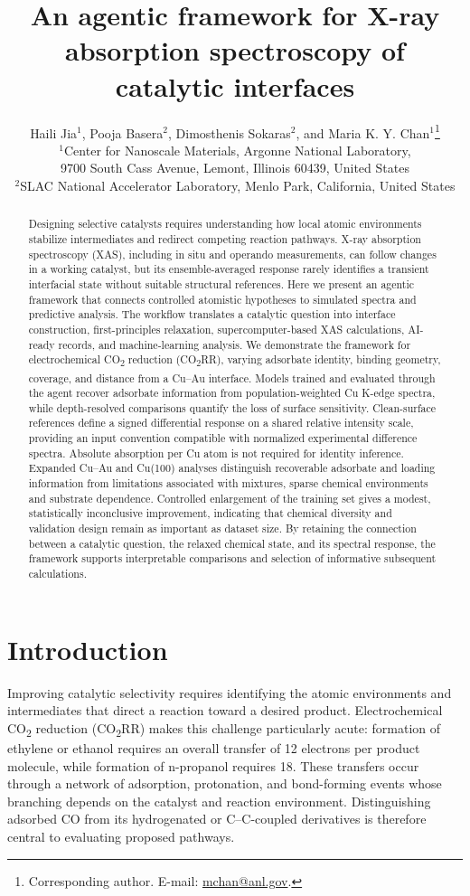 \documentclass[11pt,a4paper]{article}
\title{An agentic framework for X-ray absorption spectroscopy of catalytic interfaces}
\author{Haili Jia$^{1}$, Pooja Basera$^{2}$, Dimosthenis Sokaras$^{2}$, and Maria K. Y. Chan$^{1}$\thanks{Corresponding author. E-mail: \href{mailto:mchan@anl.gov}{mchan@anl.gov}.}\\[0.6em]
\small $^{1}$Center for Nanoscale Materials, Argonne National Laboratory,\\
\small 9700 South Cass Avenue, Lemont, Illinois 60439, United States\\[0.3em]
\small $^{2}$SLAC National Accelerator Laboratory, Menlo Park, California, United States}
\date{}
\begin{document}
\maketitle
\begin{abstract}
Designing selective catalysts requires understanding how local atomic environments stabilize intermediates and redirect competing reaction pathways. X-ray absorption spectroscopy (XAS), including in situ and operando measurements, can follow changes in a working catalyst, but its ensemble-averaged response rarely identifies a transient interfacial state without suitable structural references. Here we present an agentic framework that connects controlled atomistic hypotheses to simulated spectra and predictive analysis. The workflow translates a catalytic question into interface construction, first-principles relaxation, supercomputer-based XAS calculations, AI-ready records, and machine-learning analysis. We demonstrate the framework for electrochemical CO\textsubscript{2} reduction (CO\textsubscript{2}RR), varying adsorbate identity, binding geometry, coverage, and distance from a Cu--Au interface. Models trained and evaluated through the agent recover adsorbate information from population-weighted Cu K-edge spectra, while depth-resolved comparisons quantify the loss of surface sensitivity. Clean-surface references define a signed differential response on a shared relative intensity scale, providing an input convention compatible with normalized experimental difference spectra. Absolute absorption per Cu atom is not required for identity inference. Expanded Cu--Au and Cu(100) analyses distinguish recoverable adsorbate and loading information from limitations associated with mixtures, sparse chemical environments and substrate dependence. Controlled enlargement of the training set gives a modest, statistically inconclusive improvement, indicating that chemical diversity and validation design remain as important as dataset size. By retaining the connection between a catalytic question, the relaxed chemical state, and its spectral response, the framework supports interpretable comparisons and selection of informative subsequent calculations.
\end{abstract}

\section{Introduction}
Improving catalytic selectivity requires identifying the atomic environments and intermediates that direct a reaction toward a desired product. Electrochemical CO\textsubscript{2} reduction (CO\textsubscript{2}RR) makes this challenge particularly acute: formation of ethylene or ethanol requires an overall transfer of 12 electrons per product molecule, while formation of n-propanol requires 18.\cite{ni2024,francis2018} These transfers occur through a network of adsorption, protonation, and bond-forming events whose branching depends on the catalyst and reaction environment. Distinguishing adsorbed CO from its hydrogenated or C--C-coupled derivatives is therefore central to evaluating proposed pathways.\cite{zhan2024,montoya2015}
\end{document}
